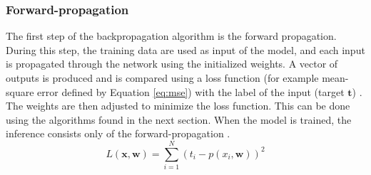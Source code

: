 \subsubsection{Forward-propagation} \label{subs:trainforward}
%
The first step of the backpropagation algorithm is the forward propagation. During this step, the training data are used as input of the model, and each input is propagated through the network using the initialized weights. A vector of outputs is produced and is compared using a loss function (for example mean-square error defined by Equation \eqref{eq:mse}) with the label of the input (target $\boldsymbol{t}$) \cite{matteucci_artificial_2019}. The weights are then adjusted to minimize the loss function. This can be done using the algorithms found in the next section. When the model is trained, the inference consists only of the forward-propagation \cite{abdelouahab_accelerating_2018}.
%
\begin{equation}
    L(\boldsymbol{x}, \boldsymbol{w}) = \sum^{N}_{i=1} (t_i - p(x_i, \boldsymbol{w}))^2
    \label{eq:mse}
\end{equation}
